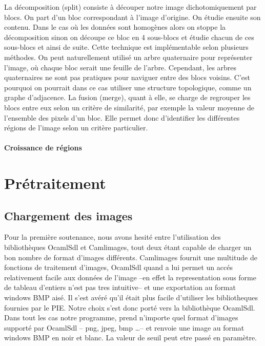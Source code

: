 \documentclass[]{report}
\begin{document}
        La décomposition (split) consiste à découper notre image dichotomiquement par blocs. On part d'un bloc correspondant à l'image d'origine. On étudie ensuite son contenu. Dans le cas où les données sont homogènes alors on stoppe la décomposition sinon on découpe ce bloc en 4 sous-blocs et étudie chacun de ces sous-blocs et ainsi de suite. Cette technique est implémentable selon plusieurs méthodes. On peut naturellement utilisé un arbre quaternaire pour représenter l'image, où chaque bloc serait une feuille de l'arbre. Cependant, les arbres quaternaires ne sont pas pratiques pour naviguer entre des blocs voisins. C'est pourquoi on pourrait dans ce cas utiliser une structure topologique, comme un graphe d'adjacence.
        La fusion (merge), quant à elle, se charge de regrouper les blocs entre eux selon un critère de similarité, par exemple la valeur moyenne de l'ensemble des pixels d'un bloc. Elle permet donc d'identifier les différentes régions de l'image selon un critère particulier.
      
      
      
      \subsubsection{Croissance de régions}
      
      
      



	\chapter{Pr\'etraitement} %
	\label{cha:pr'etraitement}
        \section{Chargement des images} %
        Pour la première soutenance, nous avons hesité entre l'utilisation des bibliothèques OcamlSdl et Camlimages, tout deux étant
        capable de charger un bon nombre de format d'images différents. Camlimages fournit une multitude de fonctions de traitement
        d'images, OcamlSdl quand a lui permet un accés relativement facile aux données de l'image --en effet la representation sous
        forme de tableau d'entiers n'est pas tres intuitive-- et une exportation au format windows BMP aisé.
        Il s'est avéré qu'il était plus facile d'utiliser les bibliotheques fournies par le PIE. Notre choix s'est donc porté vers
        la bibliothèque OcamlSdl.
        Dans tout les cas notre programme, prend n'importe quel format d'images supporté par OcamlSdl -- png, jpeg, bmp \ldots--
        et renvoie une image au format windows BMP en noir et blanc. La valeur de seuil peut etre passé en paramètre.
\end{document}
